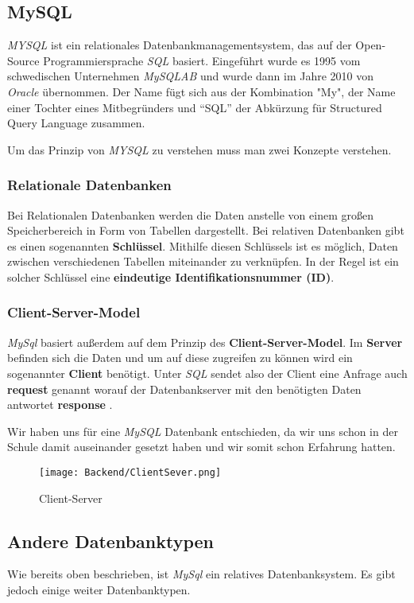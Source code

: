 \subsection{MySQL}

\textit{MYSQL} ist ein relationales Datenbankmanagementsystem, das auf der Open-Source
Programmiersprache \textit{SQL} basiert. Eingeführt wurde es 1995 vom schwedischen Unternehmen
\textit{MySQLAB} und wurde dann im Jahre 2010 von \textit{Oracle} übernommen. Der Name fügt sich
aus der Kombination "My", der Name einer Tochter eines Mitbegründers und ``SQL'' der Abkürzung
für Structured Query Language zusammen.

Um das Prinzip von \textit{MYSQL} zu verstehen muss man zwei Konzepte verstehen.

\subsubsection{Relationale Datenbanken}
Bei Relationalen Datenbanken werden die Daten anstelle von
einem großen Speicherbereich in Form von Tabellen dargestellt.
Bei relativen Datenbanken gibt es einen sogenannten \textbf{Schlüssel}. Mithilfe diesen Schlüssels
ist es möglich, Daten zwischen verschiedenen Tabellen miteinander zu verknüpfen. In der Regel ist
ein solcher Schlüssel eine \textbf{eindeutige Identifikationsnummer (ID)}.
\subsubsection{Client-Server-Model}
\textit{MySql} basiert außerdem auf dem Prinzip des \textbf{Client-Server-Model}. Im \textbf{Server}
befinden sich die Daten und um auf diese zugreifen zu können wird ein sogenannter \textbf{Client}
benötigt. Unter \textit{SQL} sendet also der Client eine Anfrage auch \textbf{request} genannt
worauf der Datenbankserver mit den benötigten Daten antwortet \textbf{response} .

Wir haben uns für eine \textit{MySQL} Datenbank entschieden, da wir uns schon in der Schule
damit auseinander gesetzt haben und wir somit schon Erfahrung hatten.

\begin{figure}[h]
    \centering
    \texttt{[image: Backend/ClientSever.png]}
    \caption{Client-Server}
\end{figure}



\subsection{Andere Datenbanktypen}
Wie bereits oben beschrieben, ist \textit{MySql} ein relatives Datenbanksystem. Es gibt
jedoch einige weiter Datenbanktypen.

